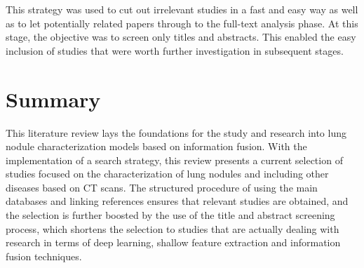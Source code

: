 This strategy was used to cut out irrelevant studies in a fast and easy way as well as to let potentially related papers through to the full-text analysis phase. At this stage, the objective was to screen only titles and abstracts. This enabled the easy inclusion of studies that were worth further investigation in subsequent stages.

\newpage
\section{Summary}

This literature review lays the foundations for the study and research into lung nodule characterization models based on information fusion. With the implementation of a search strategy, this review presents a current selection of studies focused on the characterization of lung nodules and including other diseases based on CT scans. The structured procedure of using the main databases and linking references ensures that relevant studies are obtained, and the selection is further boosted by the use of the title and abstract screening process, which shortens the selection to studies that are actually dealing with research in terms of deep learning, shallow feature extraction and information fusion techniques.
